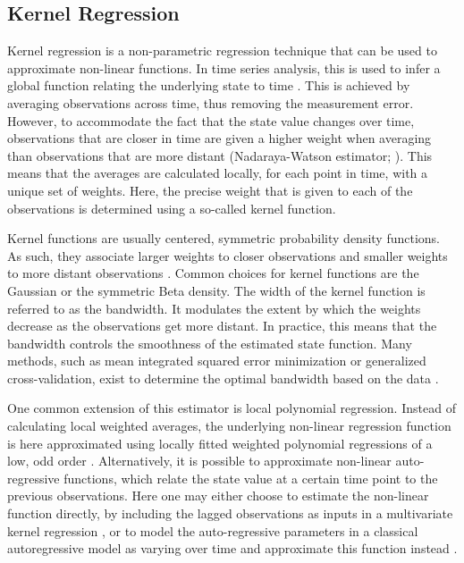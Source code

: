 \subsection{Kernel Regression}

Kernel regression is a non-parametric regression technique that can be used to 
approximate non-linear functions. In time series analysis, this is used to infer a global 
function relating the underlying state to time
\parencite{tsay_nonlinear_2019}. This is achieved by 
averaging observations across time, thus removing the measurement error. 
However, to accommodate the fact that the state value changes over time, 
observations that are closer in time are given a higher weight when averaging 
than observations that are more distant (Nadaraya-Watson estimator; 
\cite{nadaraya_estimating_1964, watson_smooth_1964, bierens_topics_1994}). 
This means that the averages are calculated locally, for each point in time, with a 
unique set of weights. Here, the precise weight that is given to each of the observations is determined 
using a so-called kernel function. 

Kernel functions are usually centered, symmetric probability density functions. 
As such, they associate larger weights to closer observations and smaller weights to more distant observations
\parencite{nadaraya_estimating_1964}. Common choices for kernel functions are the 
Gaussian or the symmetric Beta density. The width of the kernel function is 
referred to as the bandwidth. It modulates the extent by which the 
weights decrease as the observations get more distant. In practice, this
means that the bandwidth controls the smoothness of the estimated state function. Many methods,
such as mean integrated squared error minimization or generalized cross-validation, exist to determine the optimal 
bandwidth based on the data \parencite{kohler_review_2014, debruyne_model_2008}. 

One common extension of this estimator is local polynomial regression. Instead of 
calculating local weighted averages, the underlying non-linear regression function
is here approximated using locally fitted weighted polynomial regressions of a 
low, odd order \parencite{fan_adaptive_1995, ruppert_multivariate_1994, 
fan_local_2018, avery_literature_nodate}. Alternatively, it is possible 
to approximate non-linear auto-regressive functions, 
which relate the state value at a certain time point to the previous observations. 
Here one may either choose to estimate the non-linear function directly, by including 
the lagged observations as inputs in a multivariate kernel regression  
\parencite{tsay_nonlinear_2019, schimek_multivariate_2000}, or to model the auto-regressive 
parameters in a classical autoregressive model as varying over time and approximate this function 
instead \parencite{haslbeck_tutorial_2021, shim_kernel_2009}. 

